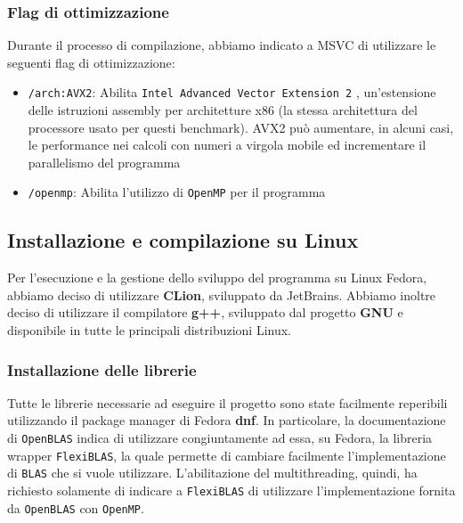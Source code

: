 \subsubsection{Flag di ottimizzazione}
Durante il processo di compilazione, abbiamo indicato a MSVC di utilizzare le seguenti flag di ottimizzazione:
\begin{itemize}
	\item \texttt{/arch:AVX2}: Abilita \texttt{Intel Advanced Vector Extension 2} \cite{avx2}, un'estensione delle istruzioni assembly per architetture x86 (la stessa architettura del processore usato per questi benchmark).
	AVX2 può aumentare, in alcuni casi, le performance nei calcoli con numeri a virgola mobile ed incrementare il parallelismo del programma
	\item \texttt{/openmp}: Abilita l'utilizzo di \texttt{OpenMP} per il programma
\end{itemize}
\subsection{Installazione e compilazione su Linux}
Per l'esecuzione e la gestione dello sviluppo del programma su Linux Fedora, abbiamo deciso di utilizzare \textbf{CLion}, sviluppato
da JetBrains. Abbiamo inoltre deciso di utilizzare il compilatore \textbf{g++}, sviluppato dal progetto \textbf{GNU} e disponibile in tutte le
principali distribuzioni Linux.
\subsubsection{Installazione delle librerie}
Tutte le librerie necessarie ad eseguire il progetto sono state facilmente reperibili utilizzando il package manager di Fedora
\textbf{dnf}. In particolare, la documentazione di \texttt{OpenBLAS} \cite{openblas_installation} indica di utilizzare congiuntamente ad essa, su Fedora,
la libreria wrapper \texttt{FlexiBLAS}\cite{flexiblas}, la quale permette di cambiare facilmente l'implementazione di \texttt{BLAS} che si vuole utilizzare.
L'abilitazione del multithreading, quindi, ha richiesto solamente di indicare a \texttt{FlexiBLAS} di utilizzare l'implementazione fornita da \texttt{OpenBLAS} con \texttt{OpenMP}.
